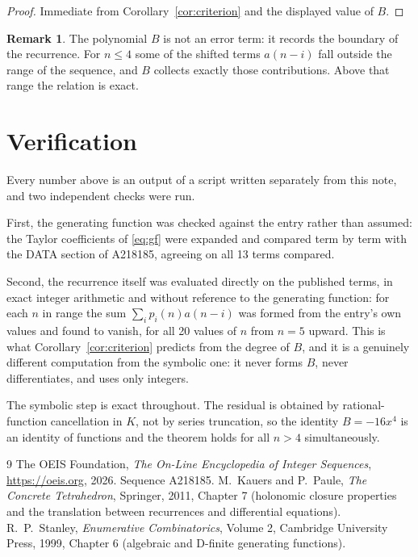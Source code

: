 \documentclass[11pt,a4paper]{article}
\theoremstyle{plain}
\theoremstyle{definition}
\newtheorem{remark}[theorem]{Remark}
\begin{document}
\begin{proof}
Immediate from Corollary~\ref{cor:criterion} and the displayed value of $B$.
\end{proof}

\begin{remark}
The polynomial $B$ is not an error term: it records the boundary of the recurrence. For
$n\le4$ some of the shifted terms $a(n-i)$ fall outside the range of the sequence,
and $B$ collects exactly those contributions. Above that range the relation is exact.
\end{remark}

\section{Verification}

Every number above is an output of a script written separately from this note, and two
independent checks were run.

First, the generating function was checked against the entry rather than assumed: the
Taylor coefficients of \eqref{eq:gf} were expanded and compared term by term with the DATA
section of A218185, agreeing on all 13 terms compared.

Second, the recurrence itself was evaluated directly on the published terms, in exact
integer arithmetic and without reference to the generating function: for each $n$ in range
the sum $\sum_{i}p_{i}(n)a(n-i)$ was formed from the entry's own values and found to
vanish, for all 20 values of $n$ from $n=5$ upward. This is what
Corollary~\ref{cor:criterion} predicts from the degree of $B$, and it is a genuinely
different computation from the symbolic one: it never forms $B$, never differentiates, and
uses only integers.

The symbolic step is exact throughout. The residual is obtained by rational-function
cancellation in $K$, not by series truncation, so the identity $B=- 16 x^{4}$ is an
identity of functions and the theorem holds for all $n>4$ simultaneously.

\begin{thebibliography}{9}
 The OEIS Foundation, \emph{The On-Line Encyclopedia of Integer Sequences},
\url{https://oeis.org}, 2026. Sequence A218185.
 M.~Kauers and P.~Paule, \emph{The Concrete Tetrahedron}, Springer, 2011,
Chapter 7 (holonomic closure properties and the translation between recurrences and
differential equations).
 R.~P.~Stanley, \emph{Enumerative Combinatorics}, Volume 2, Cambridge
University Press, 1999, Chapter 6 (algebraic and D-finite generating functions).
\end{thebibliography}
\end{document}

